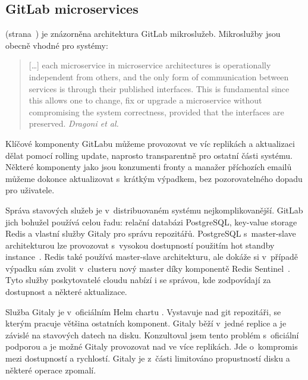         \subsection{GitLab microservices}
             (strana~\pageref{pic:gitlab-architecture}) je znázorněna architektura GitLab mikroslužeb. Mikroslužby jsou obecně vhodné pro  systémy:

            \begin{quote}
                [\ldots] each microservice in microservice architectures is operationally independent from others, and the only form of communication between services is through their published interfaces. This is fundamental since this allows one to change, fix or upgrade a microservice without compromising the system correctness, provided that the interfaces are preserved. \textit{Dragoni et al.~\cite{dragoni-microservices}}
            \end{quote}

            Klíčové komponenty GitLabu můžeme provozovat ve víc replikách a aktualizaci dělat pomocí rolling update, naprosto transparentně pro ostatní části systému. Některé komponenty jako jsou konzumenti fronty a manažer příchozích emailů můžeme dokonce aktualizovat s~krátkým výpadkem, bez pozorovatelného dopadu pro uživatele.

            Správa stavových služeb je v~distribuovaném systému nejkomplikovanější. GitLab jich bohužel používá celou řadu: relační databázi PostgreSQL, key-value storage Redis a vlastní služby Gitaly pro správu repozitářů. PostgreSQL s~master-slave architekturou lze provozovat s~vysokou dostupností použitím hot standby instance~\cite{kim-postgres}. Redis také používá master-slave architekturu, ale dokáže si v~případě výpadku sám zvolit v~clusteru nový master díky komponentě Redis Sentinel~\cite{redis-ha}. Tyto služby poskytovatelé cloudu nabízí i se správou, kde zodpovídají za dostupnost a některé aktualizace.

            Služba Gitaly je v~oficiálním Helm chartu . Vystavuje   nad git repozitáři, se kterým pracuje většina ostatních komponent. Gitaly běží v~jedné replice a je závislé na stavových datech na disku. Konzultoval jsem tento problém s~oficiální podporou a je možné Gitaly provozovat nad  ve více replikách. Jde o~kompromis mezi dostupností a rychlostí. Gitaly je z~části limitováno propustností disku a  některé operace zpomalí.

